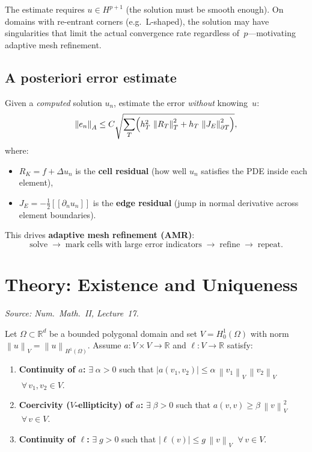\documentclass[11pt,a4paper]{article}
\theoremstyle{plain}
\theoremstyle{remark}
\newcommand{\R}{\mathbb{R}}
\newcommand{\norm}[1]{\left\| #1 \right\|}
\newcommand{\un}{u_n}
\newcommand{\jump}[1]{[\![#1]\!]}
\let\origsubsection\subsection
\renewcommand{\subsection}{\needspace{6\baselineskip}\origsubsection}
\begin{document}
\begin{warning}
The estimate requires $u \in H^{p+1}$ (the solution must be smooth
enough).  On domains with re-entrant corners (e.g.\ L-shaped), the
solution may have singularities that limit the actual convergence rate
regardless of~$p$---motivating adaptive mesh refinement.
\end{warning}

\subsection{A posteriori error estimate}

Given a \emph{computed} solution $\un$, estimate the error
\emph{without} knowing~$u$:
\begin{equation}
  \norm{e_n}_A
  \leq C \sqrt{\sum_T
    \Bigl(
      h_T^2\,\norm{R_T}_T^2
      + h_T\,\norm{J_E}_{\partial T}^2
    \Bigr)},
  \label{eq:aposteriori}
\end{equation}
where:
\begin{itemize}[nosep]
  \item $R_K = f + \Delta \un$ is the \textbf{cell residual}
        (how well $\un$ satisfies the PDE inside each element),
  \item $J_E = -\tfrac{1}{2}\jump{\partial_n \un}$ is the
        \textbf{edge residual} (jump in normal derivative across
        element boundaries).
\end{itemize}

This drives \textbf{adaptive mesh refinement (AMR)}:
\[
  \text{solve}
  \;\to\;
  \text{mark cells with large error indicators}
  \;\to\;
  \text{refine}
  \;\to\;
  \text{repeat}.
\]

\newpage
\section{Theory: Existence and Uniqueness}
\label{sec:laxmilgram}

\textit{Source: Num.\ Math.\ II, Lecture~17.}

\begin{definition}
Let $\Omega \subset \R^d$ be a bounded polygonal domain and set
$V = H_0^1(\Omega)$ with norm
$\norm{u}_V = \norm{u}_{H^1(\Omega)}$.
Assume $a: V \times V \to \R$ and
$\ell: V \to \R$ satisfy:
\begin{enumerate}[label=\alph*),nosep]
  \item \textbf{Continuity of $a$:}\;
        $\exists\;\alpha > 0$ such that
        $|a(v_1,v_2)| \leq \alpha\,\norm{v_1}_V\,\norm{v_2}_V$
        $\;\forall\, v_1,v_2 \in V$.
  \item \textbf{Coercivity ($V$-ellipticity) of $a$:}\;
        $\exists\;\beta > 0$ such that
        $a(v,v) \geq \beta\,\norm{v}_V^2$
        $\;\forall\, v \in V$.
  \item \textbf{Continuity of $\ell$:}\;
        $\exists\;g > 0$ such that
        $|\ell(v)| \leq g\,\norm{v}_V$
        $\;\forall\, v \in V$.
\end{enumerate}
\end{definition}
\end{document}
